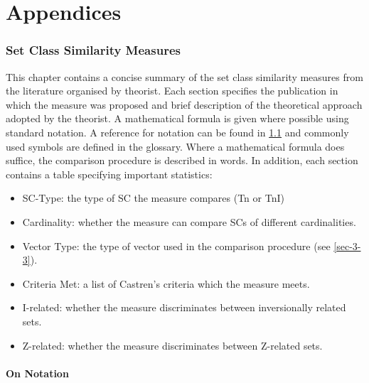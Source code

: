 \documentclass{article}
\begin{document}
\clearpage



\clearpage
\part{Appendices}
\appendix
\section{Set Class Similarity Measures}
\label{sec-11}

This chapter contains a concise summary of the set class similarity
measures from the literature organised by theorist. Each section
specifies the publication in which the measure was proposed and brief
description of the theoretical approach adopted by the theorist. A
mathematical formula is given where possible using standard notation. A
reference for notation can be found in \ref{sec-11-1} and commonly used
symbols are defined in the glossary. Where a mathematical formula does
suffice, the comparison procedure is described in words. In addition,
each section contains a table specifying important statistics:
\begin{itemize}
\item SC-Type: the type of SC the measure compares (Tn or TnI)
\item Cardinality: whether the measure can compare SCs of different
  cardinalities.
\item Vector Type: the type of vector used in the comparison procedure
  (see \ref{sec-3-3}).
\item Criteria Met: a list of Castren's criteria which the measure meets.
\item I-related: whether the measure discriminates between inversionally
  related sets.
\item Z-related: whether the measure discriminates between Z-related sets.
\end{itemize}
\subsection{On Notation}
\label{sec-11-1}
\end{document}
